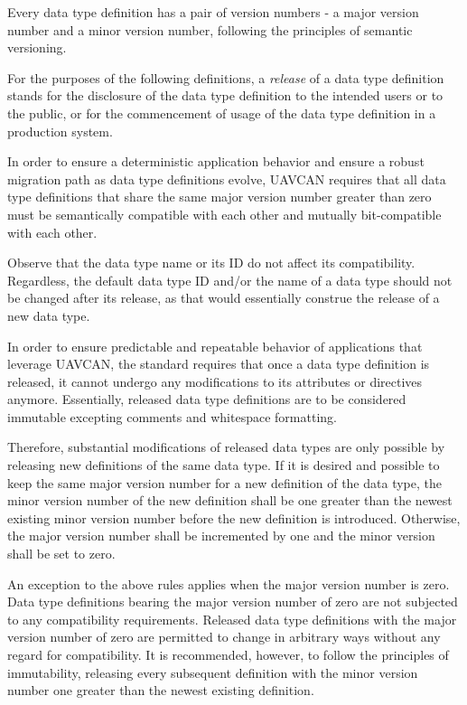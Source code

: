 Every data type definition has a pair of version numbers -
a major version number and a minor version number, following the principles of semantic versioning.

For the purposes of the following definitions, a \emph{release} of a data type definition stands for
the disclosure of the data type definition to the intended users or to the public,
or for the commencement of usage of the data type definition in a production system.

In order to ensure a deterministic application behavior and ensure a robust migration path
as data type definitions evolve, UAVCAN requires that all data type definitions that share the same
major version number greater than zero must be semantically compatible with each other
and mutually bit-compatible with each other.

Observe that the data type name or its ID do not affect its compatibility.
Regardless, the default data type ID and/or the name of a data type should not be changed after its release,
as that would essentially construe the release of a new data type.

In order to ensure predictable and repeatable behavior of applications that leverage UAVCAN,
the standard requires that once a data type definition is released, it cannot undergo any modifications to
its attributes or directives anymore.
Essentially, released data type definitions are to be considered immutable excepting
comments and whitespace formatting.

Therefore, substantial modifications of released data types are only possible by releasing
new definitions of the same data type.
If it is desired and possible to keep the same major version number for a new definition of the data type,
the minor version number of the new definition shall be one greater than the newest existing minor version
number before the new definition is introduced.
Otherwise, the major version number shall be incremented by one and the minor version shall be set to zero.

An exception to the above rules applies when the major version number is zero.
Data type definitions bearing the major version number of zero are not subjected to any compatibility requirements.
Released data type definitions with the major version number of zero are permitted to change in arbitrary
ways without any regard for compatibility.
It is recommended, however, to follow the principles of immutability, releasing every subsequent definition
with the minor version number one greater than the newest existing definition.

